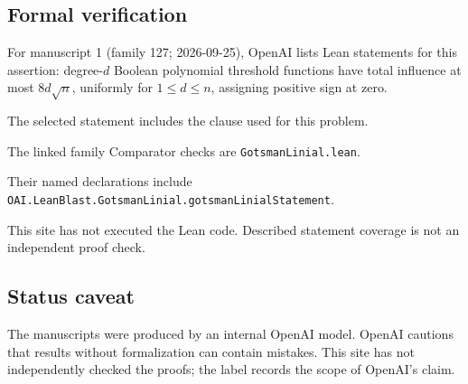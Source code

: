 \documentclass[11pt]{article}
\begin{document}
\subsection{Formal verification}
For manuscript 1 (family 127; 2026-09-25), OpenAI lists Lean statements for this assertion: degree-$d$ Boolean polynomial threshold functions have total influence at most $8d\sqrt n$, uniformly for $1\le d\le n$, assigning positive sign at zero.

The selected statement includes the clause used for this problem.

The linked family Comparator checks are \texttt{GotsmanLinial.lean}.

Their named declarations include \texttt{OAI.LeanBlast.GotsmanLinial.gotsmanLinialStatement}.

This site has not executed the Lean code. Described statement coverage is not an independent proof check.

\subsection{Status caveat}
The manuscripts were produced by an internal OpenAI model. OpenAI cautions that results without formalization can contain mistakes. This site has not independently checked the proofs; the label records the scope of OpenAI's claim.
\end{document}
